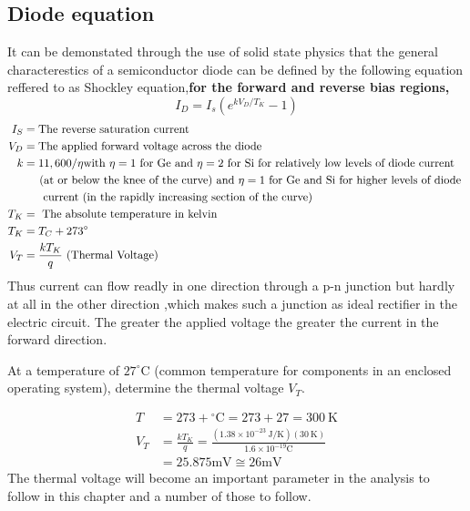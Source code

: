 \subsection{Diode equation}
It can be demonstated through the use of solid state physics that the general characterestics of a semiconductor diode can be defined by the following equation reffered to as Shockley equation,\textbf{for the forward and reverse bias regions,}
\begin{equation}
I_{D}=I_{s}\left(e^{k V_{D} / T_{K}}-1\right)
\end{equation}
\begin{align*}
I_S& =\text{The reverse saturation current }\\
V_D &=\text{The applied forward voltage across the diode}\\
k&=11,600 / \eta \text{with $\eta=1$ for Ge and $\eta=2$ for Si for relatively low levels of diode current }\\& \left. \right. \hspace{0.3cm} \text{(at or below the knee of the curve) and $\eta=1$ for Ge and Si for higher levels of diode }\\& \left. \right. \hspace{0.3cm} \text{ current (in the rapidly increasing section of the curve)}\\
T_K&=\text{ The absolute temperature in kelvin}\\
T_{K}&=T_{C}+273^{\circ}\\
V_{T} &=\frac{k T_{K}}{q} \ (\text{Thermal Voltage})
\end{align*}
Thus current can flow readly in one direction through a p-n junction but hardly at all in the other direction ,which makes such a junction as ideal rectifier in the electric circuit. The greater the applied voltage the greater the current in the forward direction.
\begin{exercise}
At a temperature of $27^{\circ} \mathrm{C}$ (common temperature for components in an enclosed operating system), determine the thermal voltage $V_{T}$.
\end{exercise}
\begin{answer}
$$
\begin{aligned}
T &=273+{ }^{\circ} \mathrm{C}=273+27=300 \mathrm{~K} \\
V_{T} &=\frac{k T_{K}}{q}=\frac{\left(1.38 \times 10^{-23} \mathrm{~J} / \mathrm{K}\right)(30 \mathrm{~K})}{1.6 \times 10^{-19} \mathrm{C}} \\
&=25.875 \mathrm{mV} \cong 26 \mathrm{mV}
\end{aligned}
$$
The thermal voltage will become an important parameter in the analysis to follow in this chapter and a number of those to follow.
\end{answer}  

